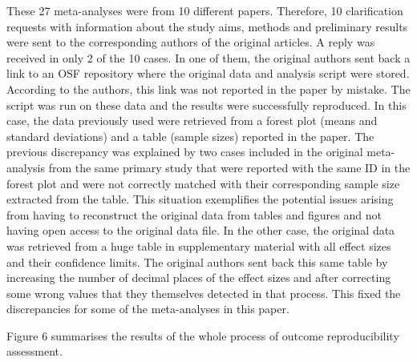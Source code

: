 \documentclass[
  ,jou, a4paper,floatsintext]{apa6}
\begin{document}
These 27 meta-analyses were from 10 different papers. Therefore, 10 clarification requests with information about the study aims, methods and preliminary results were sent to the corresponding authors of the original articles. A reply was received in only 2 of the 10 cases.
In one of them, the original authors sent back a link to an OSF repository where the original data and analysis script were stored. According to the authors, this link was not reported in the paper by mistake. The script was run on these data and the results were successfully reproduced. In this case, the data previously used were retrieved from a forest plot (means and standard deviations) and a table (sample sizes) reported in the paper. The previous discrepancy was explained by two cases included in the original meta-analysis from the same primary study that were reported with the same ID in the forest plot and were not correctly matched with their corresponding sample size extracted from the table. This situation exemplifies the potential issues arising from having to reconstruct the original data from tables and figures and not having open access to the original data file.
In the other case, the original data was retrieved from a huge table in supplementary material with all effect sizes and their confidence limits. The original authors sent back this same table by increasing the number of decimal places of the effect sizes and after correcting some wrong values that they themselves detected in that process. This fixed the discrepancies for some of the meta-analyses in this paper.

Figure 6 summarises the results of the whole process of outcome reproducibility assessment.
\end{document}
